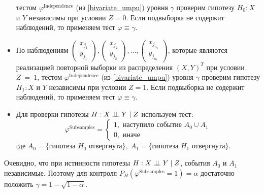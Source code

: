 \begin{itemize}
тестом $\varphi^{\text{Independence}}$ (из \autoref{bivariate_umpu}) уровня $\gamma$
проверим гипотезу $H_0 : X$ и $Y$ независимы при условии $Z=0$. 
Если подвыборка не содержит наблюдений, то применяем тест 
$\varphi \equiv \gamma$.
\item По наблюдениям 
    $
    \begin{pmatrix}
        x_{j_1} \\
        y_{j_1} 
    \end{pmatrix},
    \begin{pmatrix}
        x_{j_2} \\
        y_{j_2}
    \end{pmatrix}, \ldots,
    \begin{pmatrix}
        x_{j_{n_1}} \\
        y_{j_{n_1}}
    \end{pmatrix}
    $, которые являются реализацией 
    повторной выборки из распределения 
    $(X,Y)^T$ при условии $Z~=~1$,
тестом $\varphi^{\text{Independence}}$ (из \autoref{bivariate_umpu}) уровня $\gamma$
проверим гипотезу $H_1 : X$ и $Y$ независимы при условии $Z=1$.
Если подвыборка не содержит наблюдений, то применяем тест 
$\varphi \equiv \gamma$.
\item 
Для проверки гипотезы $H: X \perp\!\!\!\perp Y \mid Z$ используем тест:
$$
\varphi^{\text{Subsamples}}=\begin{cases}
    1, \text{ наступило событие $A_0 \cup A_1$}\\
    0, \text{ иначе}
\end{cases}
$$
где $A_0 = \{\text{гипотеза $H_0$ отвергнута}\},\;
A_1 = \{\text{гипотеза $H_1$ отвергнута}\}$.
\end{itemize}
Очевидно, что при истинности гипотезы $H: X \perp\!\!\!\perp Y \mid Z$,
события $A_0$ и $A_1$ независимые. Поэтому для контроля
$P_{H}(\varphi^{\text{Subsamples}}=1)=\alpha$ достаточно положить
$\gamma = 1 - \sqrt{1-\alpha}$.


